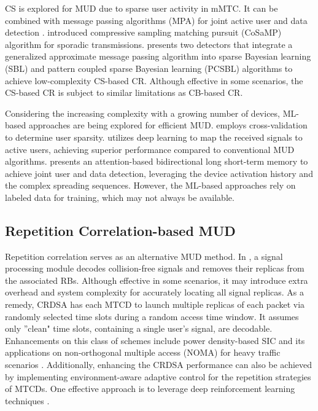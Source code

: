 \documentclass[a4paper]{IEEEtran}
\begin{document}
CS is explored for MUD due to sparse user activity in mMTC. It can be combined with message passing algorithms (MPA) for joint active user and data detection \cite{cs-based1}. \cite{cs-based3} introduced compressive sampling matching pursuit (CoSaMP) algorithm for sporadic transmissions. \cite{cs-based5} presents two detectors that integrate a generalized approximate message passing algorithm into sparse Bayesian learning (SBL) and pattern coupled sparse Bayesian learning (PCSBL) algorithms to achieve low-complexity CS-based CR. Although effective in some scenarios, the CS-based CR is subject to similar limitations as CB-based CR. 

Considering the increasing complexity with a growing number of devices, ML-based approaches are being explored for efficient MUD. \cite{ml-based1} employs cross-validation to determine user sparsity. \cite{ml-based2} utilizes deep learning to map the received signals to active users, achieving superior performance compared to conventional MUD algorithms. \cite{ml-based3} presents an attention-based bidirectional long short-term memory to achieve joint user and data detection, leveraging the device activation history and the complex spreading sequences. However, the ML-based approaches rely on labeled data for training, which may not always be available.

\subsection{Repetition Correlation-based MUD}
Repetition correlation serves as an alternative MUD method. In \cite{SIC1}, a signal processing module decodes collision-free signals and removes their replicas from the associated RBs. %
Although effective in some scenarios, it may introduce extra overhead and system complexity for accurately locating all signal replicas. As a remedy, CRDSA \cite{CRDSA1} has each MTCD to launch multiple replicas of each packet via randomly selected time slots during a random access time window. It assumes only ''clean" time slots, containing a single user's signal, are decodable. Enhancements on this class of schemes include power density-based SIC and its applications on non-orthogonal multiple access (NOMA) for heavy traffic scenarios \cite{CRDSA4}. Additionally, enhancing the CRDSA performance can also be achieved by implementing environment-aware adaptive control for the repetition strategies of MTCDs. One effective approach is to leverage deep reinforcement learning techniques \cite{DRL_K_adj}.
\end{document}
